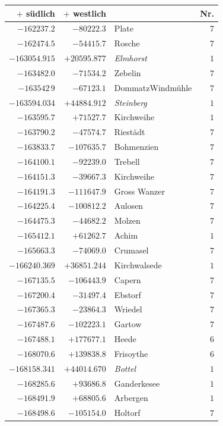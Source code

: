 \clearpage{}%
\begin{center}\begingroup\fontsize{8}{9}\selectfont
\setlength{\tabcolsep}{4pt}
\begin{tabular}{r|r|p{170pt}|r}\hline
\(+\) südlich&\(+\) westlich&&Nr.\\\hline
\(-162237.2\)&\(-80222.3\)&Plate&\(7\)\\
\(-162474.5\)&\(-54415.7\)&Rosche&\(7\)\\
\(-163054.915\)&\(+20595.877\)&\textit{Elmhorst}&\(1\)\\
\(-163482.0\)&\(-71534.2\)&Zebelin&\(7\)\\
\(-163542\,9\)&\(-67123.1\)&DommatzWindmühle&\(7\)\\
\(-163594.034\)&\(+44884.912\)&\textit{Steinberg}&\(1\)\\
\(-163595.7\)&\(+71527.7\)&Kirchweihe&\(1\)\\
\(-163790.2\)&\(-47574.7\)&Riestädt&\(7\)\\
\(-163833.7\)&\(-107635.7\)&Bohmenzien&\(7\)\\
\(-164100.1\)&\(-92239.0\)&Trebell&\(7\)\\
\(-164151.3\)&\(-39667.3\)&Kirchweihe&\(7\)\\
\(-164191.3\)&\(-111647.9\)&Gross Wanzer&\(7\)\\
\(-164225.4\)&\(-100812.2\)&Aulosen&\(7\)\\
\(-164475.3\)&\(-44682.2\)&Molzen&\(7\)\\
\(-165412.1\)&\(+61262.7\)&Achim&\(1\)\\
\(-165663.3\)&\(-74069.0\)&Crumasel&\(7\)\\
\(-166240.369\)&\(+36851.244\)&Kirchwalsede&\(1\)\\
\(-167135.5\)&\(-106443.9\)&Capern&\(7\)\\
\(-167200.4\)&\(-31497.4\)&Ebstorf&\(7\)\\
\(-167365.3\)&\(-23864.3\)&Wriedel&\(7\)\\
\(-167487.6\)&\(-102223.1\)&Gartow&\(7\)\\
\(-167488.1\)&\(+177677.1\)&Heede&\(6\)\\
\(-168070.6\)&\(+139838.8\)&Frisoythe&\(6\)\\
\(-168158.341\)&\(+44014.670\)&\textit{Bottel}&\(1\)\\
\(-168285.6\)&\(+93686.8\)&Ganderkesee&\(1\)\\
\(-168491.9\)&\(+68805.6\)&Arbergen&\(1\)\\
\(-168498.6\)&\(-105154.0\)&Holtorf&\(7\)\\

\end{tabular}
\end{center}
